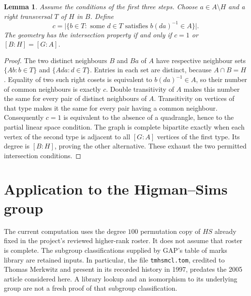 \documentclass[11pt]{article}
\newtheorem{lemma}[theorem]{Lemma}
\begin{document}
\begin{lemma}\label{l:incidence}
Assume the conditions of the first three steps. Choose $a\in A\setminus H$
and a right transversal $T$ of $H$ in $B$. Define
\[
 c=\bigl|\{b\in T:\text{ some }d\in T\text{ satisfies }
                         b(da)^{-1}\in A\}\bigr|.
\]
The geometry has the intersection property if and only if $c=1$ or
$[B:H]=[G:A]$.
\end{lemma}
\begin{proof}
The two distinct neighbours $B$ and $Ba$ of $A$ have respective neighbour
sets $\{Ab:b\in T\}$ and $\{Ada:d\in T\}$. Entries in each set are
distinct, because $A\cap B=H$. Equality of two such right cosets is
equivalent to $b(da)^{-1}\in A$, so their number of common neighbours is
exactly $c$. Double transitivity of $A$ makes this number the same for
every pair of distinct neighbours of $A$. Transitivity on vertices of
that type makes it the same for every pair having a common neighbour.
Consequently $c=1$ is equivalent to the absence of a quadrangle, hence
to the partial linear space condition. The graph is complete bipartite
exactly when each vertex of the second type is adjacent to all $[G:A]$
vertices of the first type. Its degree is $[B:H]$, proving the other
alternative. These exhaust the two permitted intersection conditions.
\end{proof}

\section*{Application to the Higman--Sims group}
The current computation uses the degree $100$ permutation copy of $HS$
already fixed in the project's reviewed higher-rank roster. It does not
assume that roster is complete. The subgroup classifications supplied by
GAP's table of marks library are retained inputs. In particular, the file
\texttt{tmhsmcl.tom}, credited to Thomas Merkwitz and present in its recorded
history in 1997, predates the 2005 article considered here. A library lookup
and an isomorphism to its underlying group are not a fresh proof of that
subgroup classification.
\end{document}
